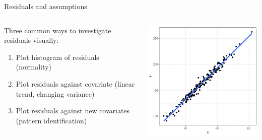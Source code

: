 \documentclass{beamer}
\begin{document}
\begin{frame}{Residuals and assumptions}
\begin{columns}

  \begin{column}{0.45\textwidth}
  Three common ways to investigate residuals visually:
  \begin{enumerate}
  \item Plot histogram of residuals (normality)
  \item Plot residuals against covariate (linear trend, changing variance)
  \item Plot residuals against new covariates (pattern identification)
  \end{enumerate}
  \end{column}
  \begin{column}{0.45\textwidth}
\begin{center}
\includegraphics[scale=0.45]{norm_fit.png}
\end{center}
  \end{column}

\end{columns}
\end{frame}
\end{document}
